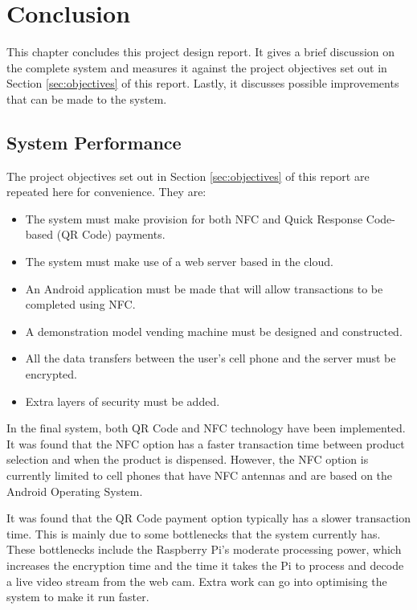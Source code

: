 \chapter{Conclusion}

This chapter concludes this project design report. It gives a brief discussion on the
complete system and measures it against the project objectives set out in Section
\ref{sec:objectives} of this report. Lastly, it discusses possible improvements that can
be made to the system. 

\section{System Performance}

The project objectives set out in Section \ref{sec:objectives} of this report are repeated
here for convenience. They are:

\begin{itemize}
  \item The system must make provision for both NFC and Quick Response Code-based (QR
  Code) payments.
  \item The system must make use of a web server based in the cloud.
  \item An Android application must be made that will allow transactions to be completed
  using NFC.
  \item A demonstration model vending machine must be designed and constructed.
  \item All the data transfers between the user's cell phone and the server must be
  encrypted.
  \item Extra layers of security must be added. 
\end{itemize}

In the final system, both QR Code and NFC technology have been implemented. It was found
that the NFC option has a faster transaction time between product selection and
when the product is dispensed.
However, the NFC option is currently limited to cell phones that have NFC antennas and are
based on the Android Operating System.

It was found that the QR Code payment option typically has a slower transaction time. This
is mainly due to some bottlenecks that the system currently has. These bottlenecks include
the Raspberry Pi's moderate processing power, which increases the encryption time and the
time it takes the Pi to process and decode a live video stream from the web cam. Extra
work can go into optimising the system to make it run faster.

